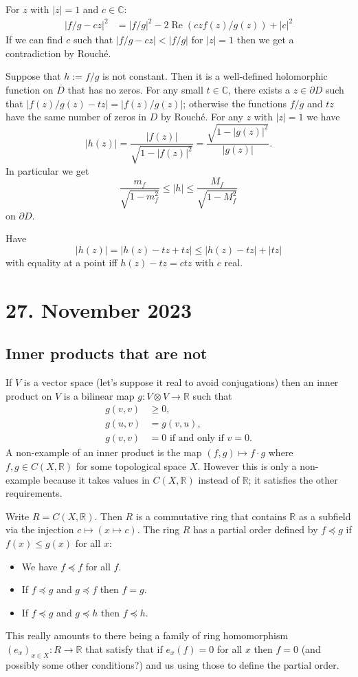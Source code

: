 \documentclass[11pt]{amsart}
\theoremstyle{definition}
\newcommand{\kk}[1]{\mathbb{#1}}
\def\ov#1{\overline{#1}}
\begin{document}
For $z$ with $|z| = 1$ and $c \in \kk C$:
\begin{align*}
|f/g - c z|^2
&= |f/g|^2 - 2 \operatorname{Re} (czf(z)/g(z)) + |c|^2
\end{align*}
If we can find $c$ such that $|f/g - cz| < |f/g|$ for $|z| = 1$ then
we get a contradiction by Rouch\'e.


Suppose that $h := f/g$ is not constant.
Then it is a well-defined holomorphic function on $\ov D$ that has no zeros.
For any small $t \in \kk C$, there exists a $z \in \partial D$ such that
$|f(z)/g(z) - tz| = |f(z)/g(z)|$; otherwise the functions $f/g$ and $tz$ have
the same number of zeros in $D$ by Rouch\'e.
For any $z$ with $|z| = 1$ we have
$$
|h(z)| = \frac{|f(z)|}{\sqrt{1 - |f(z)|^2}}
= \frac{\sqrt{1 - |g(z)|^2}}{|g(z)|}.
$$
In particular we get
$$
\frac{m_f}{\sqrt{1-m_f^2}}
\leq |h|
\leq
\frac{M_f}{\sqrt{1 - M_f^2}}
$$
on $\partial D$.

Have
$$
|h(z)| = |h(z) - tz + tz| \leq |h(z) - tz| + |tz|
$$
with equality at a point iff $h(z) - tz = c tz$ with $c$ real.


\section{27. November 2023}

\subsection*{Inner products that are not}

If $V$ is a vector space (let's suppose it real to avoid conjugations) then an
inner product on $V$ is a bilinear map $g : V \otimes V \to \kk R$ such that
\begin{align*}
	g(v, v) &\geq 0,
	\\
	g(u, v) &= g(v, u),
	\\
	g(v, v) &= 0 \text{ if and only if $v = 0$}.
\end{align*}
A non-example of an inner product is the map $(f, g) \mapsto f \cdot g$ where
$f,g \in C(X, \kk R)$ for some topological space $X$.
However this is only a non-example because it takes values in $C(X, \kk R)$
instead of $\kk R$; it satisfies the other requirements.

Write $R = C(X, \kk R)$. 
Then $R$ is a commutative ring that contains $\kk R$ as a subfield via the
injection $c \mapsto (x \mapsto c)$.
The ring $R$ has a partial order defined by $f \preceq g$ if $f(x) \leq g(x)$
for all $x$:
\begin{itemize}
\item
We have $f \preceq f$ for all $f$.

\item
If $f \preceq g$ and $g \preceq f$ then $f = g$.

\item
If $f \preceq g$ and $g \preceq h$ then $f \preceq h$.
\end{itemize}
This really amounts to there being a family of ring homomorphism $(e_x)_{x \in
X} : R \to \kk R$ that satisfy that if $e_x(f) = 0$ for all $x$ then $f = 0$
(and possibly some other conditions?) and us using those to define the partial
order.
\end{document}
